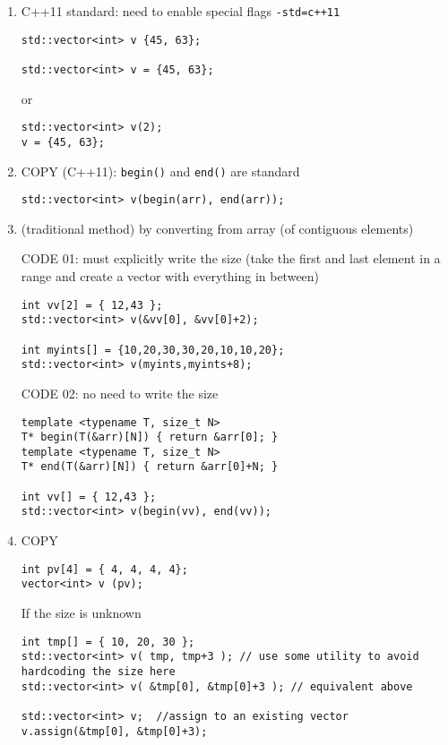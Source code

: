 \begin{enumerate}
 \item C++11 standard: need to enable special flags \verb!-std=c++11!
\begin{verbatim}
std::vector<int> v {45, 63};

std::vector<int> v = {45, 63};
\end{verbatim}
or
\begin{verbatim}
std::vector<int> v(2);
v = {45, 63};
\end{verbatim}

  \item COPY (C++11):  \verb!begin()! and \verb!end()! are standard
  
\begin{verbatim}
std::vector<int> v(begin(arr), end(arr));
\end{verbatim}

  \item (traditional method) by converting from array (of contiguous elements)

CODE 01: must explicitly write the size  (take the first and last element in a
range and create a vector with everything in between)
\begin{verbatim}
int vv[2] = { 12,43 };
std::vector<int> v(&vv[0], &vv[0]+2);

int myints[] = {10,20,30,30,20,10,10,20};
std::vector<int> v(myints,myints+8);    
\end{verbatim}

CODE 02: no need to write the size
\begin{verbatim}
template <typename T, size_t N>
T* begin(T(&arr)[N]) { return &arr[0]; }
template <typename T, size_t N>
T* end(T(&arr)[N]) { return &arr[0]+N; }

int vv[] = { 12,43 };
std::vector<int> v(begin(vv), end(vv));
\end{verbatim}

  \item COPY
\begin{verbatim}
int pv[4] = { 4, 4, 4, 4};
vector<int> v (pv);
\end{verbatim}

If the size is unknown
\begin{verbatim}
int tmp[] = { 10, 20, 30 };
std::vector<int> v( tmp, tmp+3 ); // use some utility to avoid hardcoding the size here
std::vector<int> v( &tmp[0], &tmp[0]+3 ); // equivalent above

std::vector<int> v;  //assign to an existing vector
v.assign(&tmp[0], &tmp[0]+3);


\end{verbatim}
\end{enumerate}
